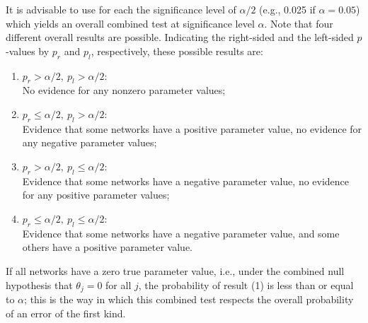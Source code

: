 \documentclass[a4paper,fleqn,11pt]{article}
\newcommand{\+}{\, + \,}
\begin{document}
      It is advisable to use for each the significance level of $\alpha/2$
      (e.g., 0.025 if $\alpha = 0.05$) which yields an overall combined test
      at significance level $\alpha$.
      Note that four different overall results are possible.
      Indicating the right-sided and the left-sided $p$-values
      by $p_r$ and $p_l$,
      respectively, these possible results are:
      \begin{enumerate}[label=(\emph{\alph*})] %
         \item $p_r >   \alpha/2, \  p_l >   \alpha/2$:\\
         No evidence for any nonzero parameter values;
         \item $p_r \leq \alpha/2, \ p_l >   \alpha/2$:\\
         Evidence that some networks have a positive parameter value,
         no evidence for any negative parameter values;
         \item $p_r >   \alpha/2, \ p_l \leq \alpha/2$:\\
         Evidence that some networks have a negative parameter value,
         no evidence for any positive parameter values;
         \item $p_r \leq \alpha/2, \ p_l \leq \alpha/2$:\\
         Evidence that some networks have a negative parameter value,
         and some others have a positive parameter value.
\end{enumerate}
      If all networks have a zero true parameter value,
      i.e., under the combined null hypothesis that
      $\theta_j = 0$  for all $j$,
      the probability of result (1) is less than or equal to $\alpha$;
      this is the way in which this combined test respects the
      overall probability of an error of the first kind.

\end{document}
